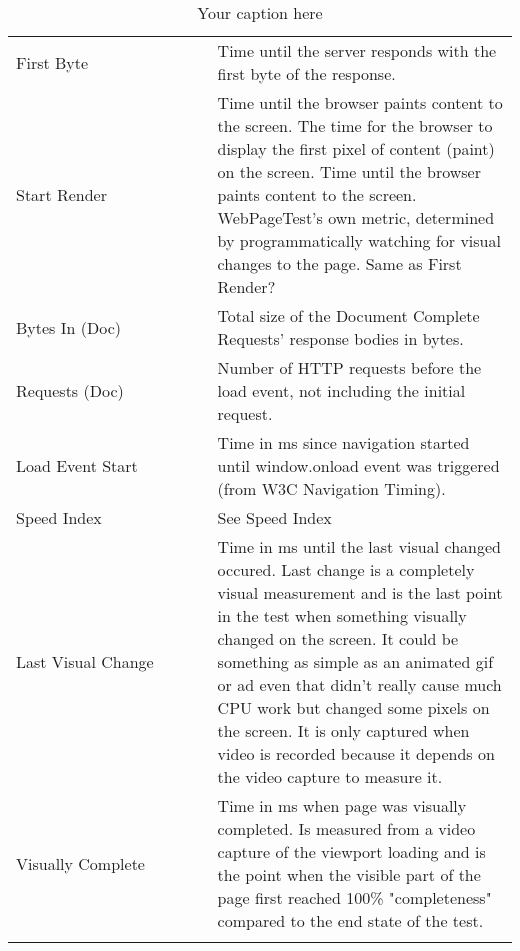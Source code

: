 \begin{center}
\begin{longtable}{ p{0.4\linewidth} | p{0.6\linewidth} }
	First Byte & Time until the server responds with the first byte of the response.  \\
	
	Start Render & Time until the browser paints content to the screen. The time for the browser to display the first pixel of content (paint) on the screen. Time until the browser paints content to the screen. WebPageTest's own metric, determined by programmatically watching for visual changes to the page. Same as First Render? \\
	
	Bytes In (Doc) & Total size of the Document Complete Requests' response bodies in bytes.  \\
	
	Requests (Doc) & Number of HTTP requests before the load event, not including the initial request. \\
	
	Load Event Start & Time in ms since navigation started until window.onload event was triggered (from W3C Navigation Timing). \\
	
	Speed Index	& See Speed Index  \\
	
	Last Visual Change & Time in ms until the last visual changed occured. Last change is a completely visual measurement and is the last point in the test when something visually changed on the screen. It could be something as simple as an animated gif or ad even that didn't really cause much CPU work but changed some pixels on the screen. It is only captured when video is recorded because it depends on the video capture to measure it. \\
	
	Visually Complete & Time in ms when page was visually completed. Is measured from a video capture of the viewport loading and is the point when the visible part of the page first reached 100\% "completeness" compared to the end state of the test. \\
	\caption{Your caption here} %
	\label{tab:myfirstlongtable}
	\end{longtable}
\end{center}



































